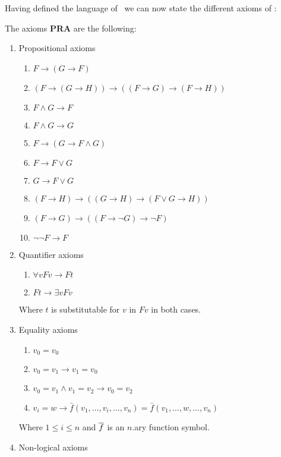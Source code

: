 \documentclass[../main.tex]{subfiles}
\begin{document}
Having defined the language of \PRA\ we can now state the different axioms of
\PRA:
\begin{defi}
	The axioms \textbf{PRA} are the following:
	\begin{enumerate}
		\item Propositional axioms
			\begin{enumerate}
				\item
					$F\rightarrow( G\rightarrow F)$
				\item
					$(F\rightarrow( G\rightarrow H)
					)\rightarrow((F\rightarrow G)\rightarrow
					(F\rightarrow H))$
				\item $F\wedge G\rightarrow F$
				\item $F\wedge G\rightarrow G$
				\item $F\rightarrow
					( G\rightarrow F\wedge G)$
				\item $F\rightarrow F\vee G$
				\item $ G\rightarrow F\vee G$
				\item
					$(F\rightarrow H)\rightarrow(( G\rightarrow
					 H)\rightarrow(F\vee G\rightarrow H))$
				\item
					$(F\rightarrow
					G)\rightarrow((F\rightarrow\neg G)
					\rightarrow\neg F)$
				\item $\neg\neg F\rightarrow F$
			\end{enumerate}
		\item Quantifier axioms
			\begin{enumerate}
				\item $\forall vF v\rightarrow F t$
				\item $F t\rightarrow \exists v F
					v$
			\end{enumerate}
			Where $t$ is substitutable for $v$ in $F v$ in
			both cases.
		\item Equality axioms
			\begin{enumerate}
				\item $v_0=v_0$
				\item $v_0=v_1\rightarrow v_1=v_0$
				\item $v_0=v_1\wedge v_1=v_2\rightarrow v_0=v_2$
				\item $v_i=w\rightarrow \bar{f}(v_1,\ldots,
					v_i,\ldots,v_n)=\bar{f}(v_1,\ldots,
					w,\ldots,v_n)$
			\end{enumerate}
			Where $1\leq i\leq n$ and $\overline{f}$ is an $n$.ary
			function symbol.
		\item Non-logical axioms
			\begin{enumerate}

\end{enumerate}
\end{enumerate}
\end{defi}
\end{document}
